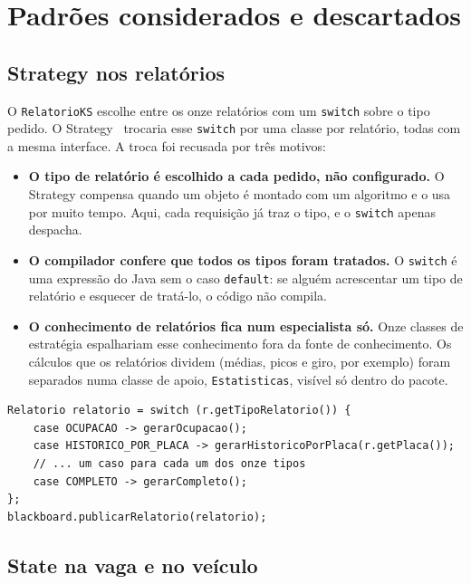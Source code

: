 \section{Padrões considerados e descartados}

\subsection{Strategy nos relatórios}

O \texttt{RelatorioKS} escolhe entre os onze relatórios com um \texttt{switch} sobre o tipo pedido. O Strategy~\cite{gamma1994} trocaria esse \texttt{switch} por uma classe por relatório, todas com a mesma interface. A troca foi recusada por três motivos:

\begin{itemize}
  \item \textbf{O tipo de relatório é escolhido a cada pedido, não configurado.} O Strategy compensa quando um objeto é montado com um algoritmo e o usa por muito tempo. Aqui, cada requisição já traz o tipo, e o \texttt{switch} apenas despacha.
  \item \textbf{O compilador confere que todos os tipos foram tratados.} O \texttt{switch} é uma expressão do Java sem o caso \texttt{default}: se alguém acrescentar um tipo de relatório e esquecer de tratá-lo, o código não compila.
  \item \textbf{O conhecimento de relatórios fica num especialista só.} Onze classes de estratégia espalhariam esse conhecimento fora da fonte de conhecimento. Os cálculos que os relatórios dividem (médias, picos e giro, por exemplo) foram separados numa classe de apoio, \texttt{Estatisticas}, visível só dentro do pacote.
\end{itemize}

\begin{lstlisting}[caption={O despacho dos relatórios (\texttt{RelatorioKS.java}, resumido).},label=cod:switch]
Relatorio relatorio = switch (r.getTipoRelatorio()) {
    case OCUPACAO -> gerarOcupacao();
    case HISTORICO_POR_PLACA -> gerarHistoricoPorPlaca(r.getPlaca());
    // ... um caso para cada um dos onze tipos
    case COMPLETO -> gerarCompleto();
};
blackboard.publicarRelatorio(relatorio);
\end{lstlisting}

\subsection{State na vaga e no veículo}

